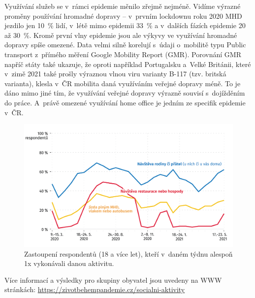 Využívání služeb se v rámci epidemie měnilo zřejmě nejméně. Vidíme výrazné proměny používání hromadné dopravy – v~prvním lockdownu roku 2020 MHD jezdilo jen 10~\% lidí, v létě mimo epidemii 33~\% a v~dalších fázích epidemie 20 až 30~\%. Kromě první vlny epidemie jsou ale výkyvy ve využívání hromadné dopravy spíše omezené. Data velmi silně korelují s~údaji o~mobilitě typu Public transport z přímého měření Google Mobility Report (GMR). Porovnání GMR napříč státy také ukazuje, že oproti například Portugalsku a Velké Británii, které v zimě 2021 také prošly výraznou vlnou viru varianty B-117 (tzv. britská varianta), klesla v~ČR mobilita daná využíváním veřejné dopravy méně. To je dáno mimo jiné tím, že využívání veřejné dopravy výrazně souvisí s dojížděním do práce. A~právě omezené využívání home office je jedním ze specifik epidemie v ČR.

\begin{figure}[ht]
    \centering
    \includegraphics[width=\textwidth]{./pic/zbp-graf3.png}
    \caption{Zastoupení respondentů (18 a více let), kteří v daném týdnu alespoň 1x vykonávali danou aktivitu.}
    \label{fig:zbp3}
\end{figure}


Více informací a výsledky pro skupiny obyvatel jsou uvedeny na WWW stránkách: \url{https://zivotbehempandemie.cz/socialni-aktivity}



